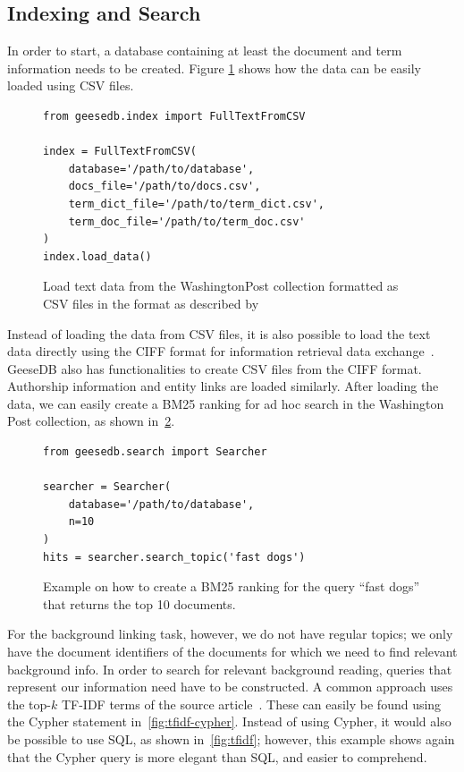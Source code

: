 \subsection{Indexing and Search}
In order to start, a database containing at least the document and term information needs to be created. Figure \ref{fig:load_text_data} shows how the data can be easily loaded using CSV files.
\begin{figure}
	\begin{verbatim}
from geesedb.index import FullTextFromCSV

index = FullTextFromCSV(
    database='/path/to/database',
    docs_file='/path/to/docs.csv',
    term_dict_file='/path/to/term_dict.csv',
    term_doc_file='/path/to/term_doc.csv'
)
index.load_data()
	\end{verbatim}
	\caption{Load text data from the WashingtonPost collection formatted as CSV files in the format as described by~\citet{OldDog}}
	\label{fig:load_text_data}
\end{figure}

Instead of loading the data from CSV files, it is also possible to load the text data directly using the CIFF format for information retrieval data exchange~\citep{ciff}. GeeseDB also has functionalities to create CSV files from the CIFF format. Authorship information and entity links are loaded similarly. After loading the data, we can easily create a BM25 ranking for ad hoc search in the Washington Post collection, as shown in~\cref{fig:code_bm25_ranking}.

\begin{figure}
	\begin{verbatim}
from geesedb.search import Searcher

searcher = Searcher(
    database='/path/to/database', 
    n=10
)
hits = searcher.search_topic('fast dogs')
	\end{verbatim}
	\caption{Example on how to create a BM25 ranking for the query ``fast dogs'' that returns the top 10 documents.}
	\label{fig:code_bm25_ranking}
\end{figure}

For the background linking task, however, we do not have regular topics; we only have the document identifiers of the documents for which we need to find relevant background info. In order to search for relevant background reading, queries that represent our information need have to be constructed. A common approach uses the top-$k$ TF-IDF terms of the source article~\citep{anserini-news}. These can easily be found using the Cypher statement in~\cref{fig:tfidf-cypher}. Instead of using Cypher, it would also be possible to use SQL, as shown in~\cref{fig:tfidf}; however, this example shows again that the Cypher query is more elegant than SQL, and easier to comprehend. 

